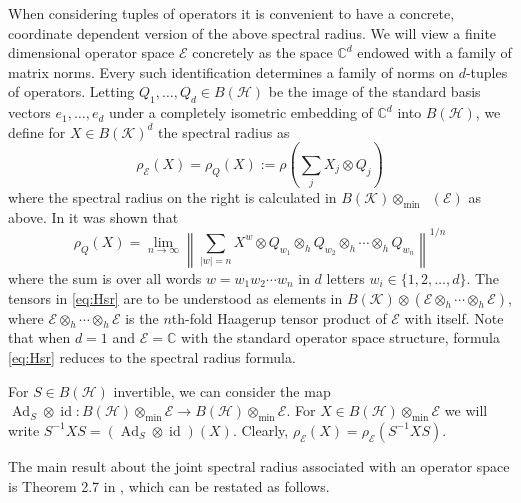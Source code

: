 \documentclass[12pt]{amsart}
\numberwithin{equation}{section}
\theoremstyle{definition}
\newcommand{\cE}{\mathcal{E}}
\newcommand{\cH}{\mathcal{H}}
\newcommand{\cK}{\mathcal{K}}
\newcommand{\bC}{\mathbb{C}}
\newcommand{\id}{\operatorname{id}}
\DeclareMathOperator{\cmax}{C^*_{\max}}
\DeclareMathOperator{\Ad}{Ad}
\begin{document}
When considering tuples of operators it is convenient to have a concrete, coordinate dependent version of the above spectral radius. 
We will view a finite dimensional operator space $\cE$ concretely as the space $\bC^d$ endowed with a family of matrix norms. 
Every such identification determines a family of norms on $d$-tuples of operators. 
Letting $Q_1, \ldots, Q_d \in B(\cH)$ be the image of the standard basis vectors $e_1, \ldots, e_d$ under a completely isometric embedding of $\bC^d$ into $B(\cH)$, we define for $X \in B(\cK)^d$ the spectral radius as 
\[
\rho_\cE(X) = \rho_Q(X) := \rho\left(\sum_j X_j \otimes Q_j\right)
\]
where the spectral radius on the right is calculated in $B(\cK) \otimes_{\min} \cmax(\cE)$ as above. 
In \cite{shalsham2025spectral} it was shown that
\begin{equation}\label{eq:Hsr}
\rho_Q(X) = \lim_{n \to \infty} \left \|\sum_{|w|=n} X^w \otimes Q_{w_1} \otimes_h Q_{w_2} \otimes_h \cdots \otimes_h Q_{w_n} \right\|^{1/n} 
\end{equation}
where the sum is over all words $w = w_1 w_2 \cdots w_n$ in $d$ letters $w_i \in \{1,2,\ldots, d\}$.
The tensors in \eqref{eq:Hsr} are to be understood as elements in $B(\cK) \otimes \left(\cE \otimes_h \cdots \otimes_h \cE\right)$, where $\cE \otimes_h \cdots \otimes_h \cE$ is the $n$th-fold Haagerup tensor product of $\cE$ with itself. 
Note that when $d = 1$ and $\cE = \bC$ with the standard operator space structure, formula \eqref{eq:Hsr} reduces to the spectral radius formula.

For $S \in B(\cH)$ invertible, we can consider the map $\Ad_S \otimes \id \colon B(\cH) \otimes_{\min} \cE \to B(\cH) \otimes_{\min} \cE$. For $X \in B(\cH) \otimes_{\min} \cE$ we will write $S^{-1} X S = (\Ad_S \otimes \id)(X)$. Clearly, $\rho_{\cE}(X) = \rho_{\cE}(S^{-1} X S)$.

The main result about the joint spectral radius associated with an operator space is Theorem 2.7 in \cite{shalsham2025spectral}, which can be restated as follows.
\end{document}
